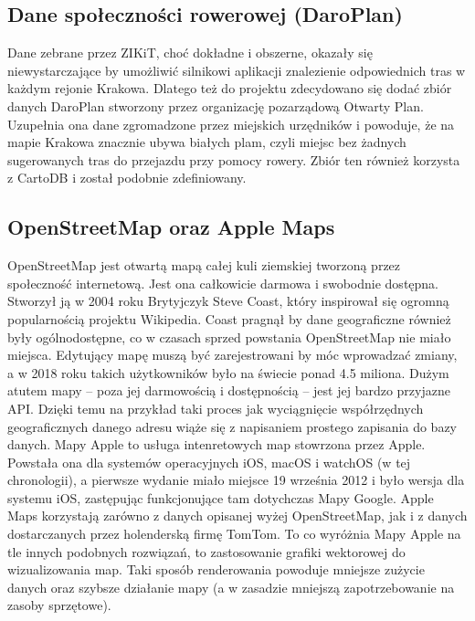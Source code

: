 \subsection{Dane społeczności rowerowej (DaroPlan)}

Dane zebrane przez ZIKiT, choć dokładne i obszerne, okazały się niewystarczające by umożliwić silnikowi aplikacji znalezienie odpowiednich tras w każdym rejonie Krakowa. Dlatego też do projektu zdecydowano się dodać zbiór danych DaroPlan stworzony przez organizację pozarządową Otwarty Plan. Uzupełnia ona dane zgromadzone przez miejskich urzędników i powoduje, że na mapie Krakowa znacznie ubywa białych plam, czyli miejsc bez żadnych sugerowanych tras do przejazdu przy pomocy rowery. Zbiór ten również korzysta z CartoDB i został podobnie zdefiniowany.

\subsection{OpenStreetMap oraz Apple Maps}

OpenStreetMap jest otwartą mapą całej kuli ziemskiej tworzoną przez społeczność internetową. Jest ona całkowicie darmowa i swobodnie dostępna. Stworzył ją w 2004 roku Brytyjczyk Steve Coast, który inspirował się ogromną popularnością projektu Wikipedia. Coast pragnął by dane geograficzne również były ogólnodostępne, co w czasach sprzed powstania OpenStreetMap nie miało miejsca. Edytujący mapę muszą być zarejestrowani by móc wprowadzać zmiany, a w 2018 roku takich użytkowników było na świecie ponad 4.5 miliona. Dużym atutem mapy – poza jej darmowością i dostępnością – jest jej bardzo przyjazne API. Dzięki temu na przykład taki proces jak wyciągnięcie współrzędnych geograficznych danego adresu wiąże się z napisaniem prostego zapisania do bazy danych.\newline
Mapy Apple to usługa intenretowych map stowrzona przez Apple. Powstała ona dla systemów operacyjnych iOS, macOS i watchOS (w tej chronologii), a pierwsze wydanie miało miejsce 19 września 2012 i było wersja dla systemu iOS, zastępując funkcjonujące tam dotychczas Mapy Google. Apple Maps korzystają zarówno z danych opisanej wyżej OpenStreetMap, jak i z danych dostarczanych przez holenderską firmę TomTom. To co wyróżnia Mapy Apple na tle innych podobnych rozwiązań, to zastosowanie grafiki wektorowej do wizualizowania map. Taki sposób renderowania powoduje mniejsze zużycie danych oraz szybsze działanie mapy (a w zasadzie mniejszą zapotrzebowanie na zasoby sprzętowe).

